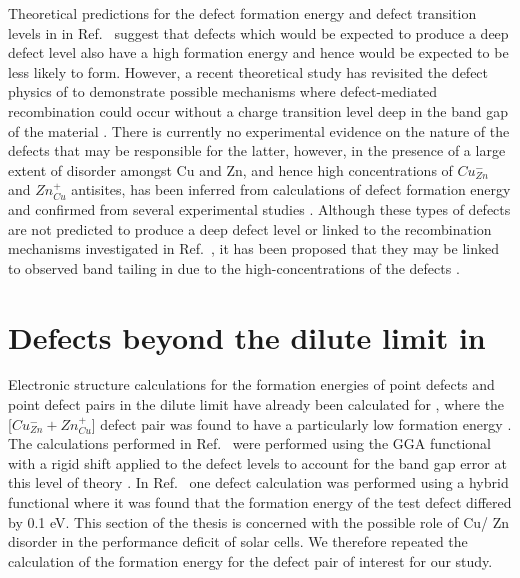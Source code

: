 \documentclass[11pt, twoside]{report}
\begin{document}
Theoretical predictions for the defect formation energy and defect transition levels in {\CZTS} in Ref.~ suggest that defects which would be expected to produce a deep defect level also have a high formation energy and hence would be expected to be less likely to form.
However, a recent theoretical study has revisited the defect physics of {\CZTS} to demonstrate possible mechanisms where defect-mediated recombination could occur without a charge transition level deep in the band gap of the material \cite{Sunghyun_killer_defects}.
There is currently no experimental evidence on the nature of the defects that may be responsible for the latter, however, in {\CZTS} the presence of a large extent of disorder amongst Cu and Zn, and hence high concentrations of $Cu_{Zn}^{-}$ and $Zn_{Cu}^{+}$ antisites, has been inferred from calculations of defect formation energy \cite{defects_Chen} and confirmed from several experimental studies \cite{Schorr, CZTS_Xray, CZTS_TEM}. Although these types of defects are not predicted to produce a deep defect level or linked to the recombination mechanisms investigated in Ref.~, it has been proposed that they may be linked to observed band tailing in {\CZTS} due to the high-concentrations of the defects \cite{band_tail}.




\section{Defects beyond the dilute limit in {\CZTS}}\label{CZTS_beyond_dilute}
Electronic structure calculations for the formation energies of point defects and point defect pairs in the dilute limit have already been calculated for {\CZTS}, where the [$Cu_{Zn}^- + Zn_{Cu}^+$] defect pair was found to have a particularly low formation energy \cite{defects_Chen}.
The calculations performed in Ref.~ were performed using the GGA functional with a rigid shift applied to the defect levels to account for the band gap error at this level of theory \cite{Lany_defects}. In Ref.~ one defect calculation was performed using a hybrid functional where it was found that the formation energy of the test defect differed by 0.1 eV. This section of the thesis is concerned with the possible role of Cu/ Zn disorder in the performance deficit of {\CZTS} solar cells. We therefore repeated the calculation of the formation energy for the defect pair of interest for our study.
\end{document}
